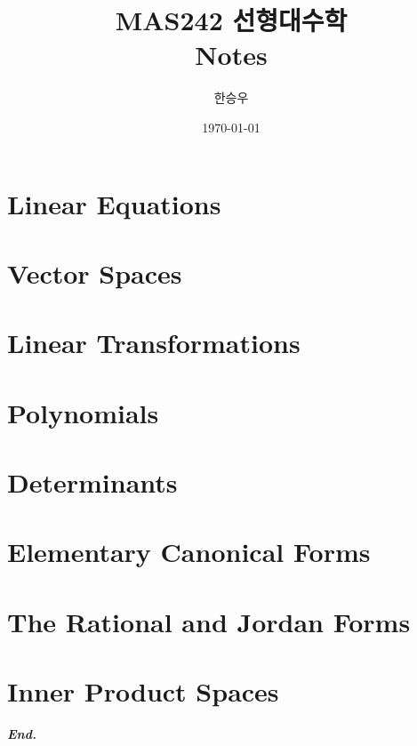 \documentclass[a4paper,12pt]{report}
\title{\Huge{MAS242 선형대수학\\Notes}}
\author{\huge{한승우}}
\date{\today}
\begin{document}
\maketitle
\newpage
{}
\tikzexternaldisable
\tableofcontents
\tikzexternalenable
\pagebreak

\chapter{Linear Equations}

\chapter{Vector Spaces}
 
\chapter{Linear Transformations}
 
\chapter{Polynomials}
 
\chapter{Determinants}
 
\chapter{Elementary Canonical Forms}
 
\chapter{The Rational and Jordan Forms}
 
\chapter{Inner Product Spaces}
 
\vfill
\begin{center}
    \textbf{\textit{End.}}
\end{center}
\end{document}
